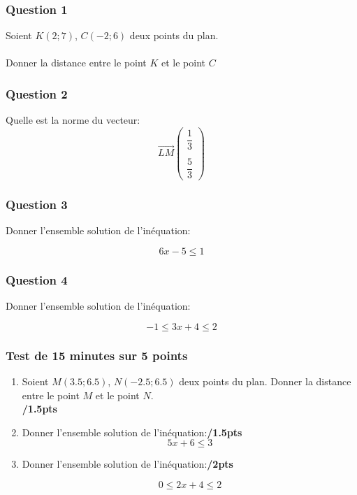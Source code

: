 \documentclass[t,12pt]{beamer}
\newcommand{\V}{\overrightarrow}
\begin{document}
\begin{frame}
\frametitle{Question 1}

Soient $K(2;7)$, $C(-2;6)$ deux points du plan.\\\hfill\\ 


Donner la distance entre le point $K$ et le point $C$

\end{frame}

\begin{frame}
\frametitle{Question 2}
Quelle est la norme du vecteur:
$$\V{LM} \begin{pmatrix}
	\dfrac{1}{3}\\
	\\\dfrac{5}{3}
\end{pmatrix}$$
\end{frame}

\begin{frame}
\frametitle{Question 3}
Donner l'ensemble solution de l'inéquation:

$$6x-5 \leq 1$$
\end{frame}

\begin{frame}
\frametitle{Question 4}
Donner l'ensemble solution de l'inéquation:

$$-1\leq3x+4 \leq 2$$
\end{frame}

\begin{frame}
\end{frame}

\begin{frame}
	\frametitle{Test de 15 minutes sur 5 points}
	\begin{enumerate}
		\item Soient $M(3.5;6.5)$, $N(-2.5;6.5)$ deux points du plan.
		Donner la distance entre le point $M$ et le point $N$.\\\hfill\textbf{/1.5pts}\\[0.5cm]
		\item Donner l'ensemble solution de l'inéquation:\hfill\textbf{/1.5pts}
		$$5x+6 \leq 3$$
		\item Donner l'ensemble solution de l'inéquation:\hfill\textbf{/2pts}
		
		$$0\leq2x+4 \leq 2$$
	\end{enumerate}
	
	
\end{frame}
\end{document}
